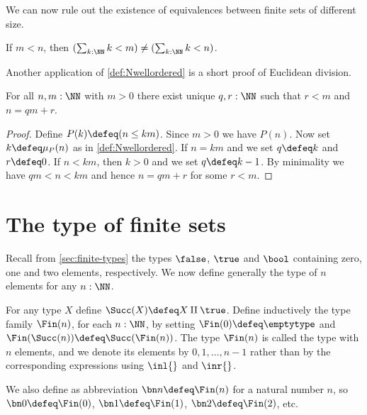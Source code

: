 We can now rule out the existence of equivalences between finite
sets of different size.
\begin{corollary}\label{cor:Fin-n-injective}
If $m<n$, then $(\sum_{k:\NN} k<m) \ne (\sum_{k:\NN} k<n)$.
\end{corollary}

Another application of \cref{def:Nwellordered} is a
short proof of Euclidean division.
\begin{lemma}\label{lem:euclid-div}
  For all $n,m:\NN$ with $m>0$ there exist unique $q,r:\NN$
  such that $r<m$ and $n = qm+r$.
\end{lemma}
\begin{proof}
Define $P(k)\defeq (n\leq km)$. Since $m>0$ we have $P(n)$.
Now set $k\defeq\mu_P(n)$ as in \cref{def:Nwellordered}.
If $n = km$ and we set $q\defeq k$ and $r\defeq 0$.
If $n<km$, then $k>0$ and we set $q\defeq k-1$.
By minimality we have $qm<n<km$ and hence $n = qm+r$ for some $r<m$.
\end{proof}

\section{The type of finite sets}
\label{sec:typeFin}
Recall from \cref{sec:finite-types} the types
$\false$, $\true$ and $\bool$ containing zero, one and two
elements, respectively. We now define generally the
type of $n$ elements for any $n:\NN$.

\begin{definition}\label{def:finiteset}
For any type $X$ define $\Succ(X)\defeq X\amalg\true$.
Define inductively the type family $\Fin(n)$, for each $n:\NN$, by
setting $\Fin(0)\defeq\emptytype$ and $\Fin(\Succ(n))\defeq\Succ(\Fin(n))$.
The type $\Fin(n)$ is called
the type with $n$ elements, and we denote its elements
by $0,1,\ldots,n-1$ rather than by the corresponding expressions
using $\inl{}$ and $\inr{}$.

We also define as abbreviation $\bn n \defeq \Fin(n)$ for a natural number $n$,
so $\bn 0 \defeq \Fin(0)$, $\bn 1 \defeq \Fin(1)$, $\bn 2 \defeq \Fin(2)$, etc.
\end{definition}

